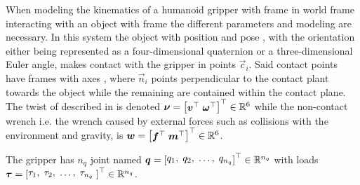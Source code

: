 When modeling the kinematics of a humanoid gripper with frame  in world frame  interacting with an object with frame  the different parameters and modeling are necessary. In this system the object with position  and pose , with the orientation either being represented as a four-dimensional quaternion or a three-dimensional Euler angle, makes contact with the gripper in points $\vec{c}_i$. Said contact points have frames  with axes , where $\vec{n}_i$ points perpendicular to the contact plant towards the object while the remaining are contained within the contact plane. The twist of  described in  is denoted $\vec{\nu} = \rvec{\vec{v}^\T\; \vec{\omega}^\T}^\T\in\R^{6} $ while the non-contact wrench i.e. the wrench caused by external forces such as collisions with the environment and gravity, is $\vec{w} = \rvec{\vec{f}^\T\; \vec{m}^\T}^\T\in\R^6$. \medskip

The gripper has $n_q$ joint named $\vec{q} = \rvec{q_1,\; q_2,\; \dots,\; q_{n_q}}^\T\in\R^{n_q}$ with loads $\vec{\tau} = \rvec{\tau_1,\;\tau_2,\;\dots,\;\tau_{n_q}\;}^\T\in\R^{n_q}$.







